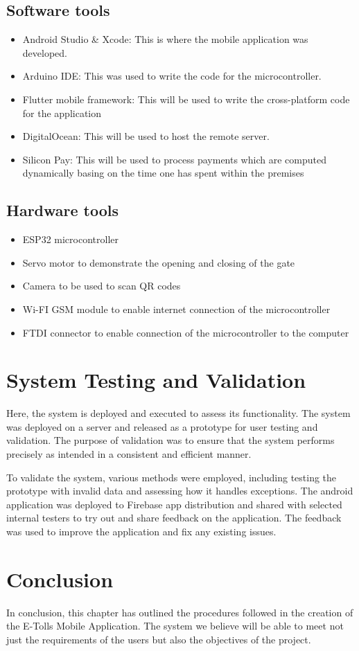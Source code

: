 \subsection{Software tools}
\begin{itemize}
    \item  Android Studio \& Xcode: This is where the mobile application was developed.
    \item Arduino IDE: This was used to write the code for the microcontroller.
    \item Flutter mobile framework: This will be used to write the cross-platform code for the application
    \item DigitalOcean: This will be used to host the remote server.
    \item Silicon Pay: This will be used to process payments which are computed dynamically basing on the time one has spent within the premises
\end{itemize}

\subsection{Hardware tools}
\begin{itemize}
    \item ESP32 microcontroller
    \item Servo motor to demonstrate the opening and closing of the gate
    \item Camera to be used to scan QR codes
    \item Wi-FI GSM module to enable internet connection of the microcontroller
    \item FTDI connector to enable connection of the microcontroller to the computer
\end{itemize}


\section{System Testing and Validation}
Here,  the system is deployed and executed to assess its functionality. The system was deployed on a server and released as a prototype for user testing and validation. The purpose of validation was to ensure that the system performs precisely as intended in a consistent and efficient manner.

To validate the system, various methods were employed, including testing the prototype with invalid data and assessing how it handles exceptions. The android application was deployed to Firebase app distribution and shared with selected internal testers to try out and share feedback on the application. The feedback was used to improve the application and fix any existing issues.


\section{Conclusion}
In conclusion, this chapter has outlined the procedures followed in the creation of the E-Tolls Mobile Application. The system we believe will be able to meet not just the requirements of the users but also the objectives of the project.